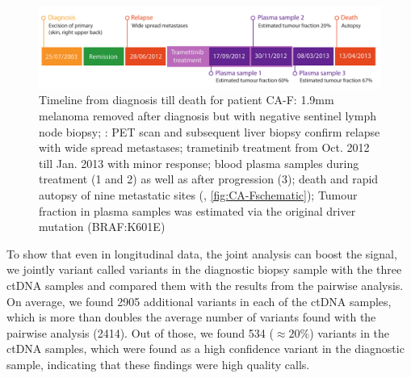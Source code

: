 \begin{figure}[ht]
\centering
\includegraphics[width=.99\linewidth]{Figures/jointVariantCalling/CA-F_timeline.pdf}
\caption[Timeline from diagnosis till death for patient CA-F]{Timeline from diagnosis till death for patient CA-F: 1.9mm melanoma removed after diagnosis  but with negative sentinel lymph node biopsy; : PET scan and subsequent liver biopsy confirm relapse with wide spread metastases; trametinib treatment from Oct. 2012 till Jan. 2013 with minor response; blood plasma samples during treatment (1 and 2) as well as after progression (3); death and rapid autopsy of nine metastatic sites (, \protect\autoref{fig:CA-Fschematic}); Tumour fraction in plasma samples was estimated via the original driver mutation (BRAF:K601E)}\label{fig:CA-Ftimeline}
\end{figure}


To show that even in longitudinal data, the joint analysis can boost the signal, we jointly variant called variants in the diagnostic biopsy sample with the three ctDNA samples and compared them with the results from the pairwise analysis. On average, we found 2905 additional variants in each of the ctDNA samples, which is more than doubles the average number of variants found with the pairwise analysis (2414). Out of those, we found 534 ($\approx 20\%$) variants in the ctDNA samples, which were found as a high confidence variant in the diagnostic sample, indicating that these findings were high quality calls. 

